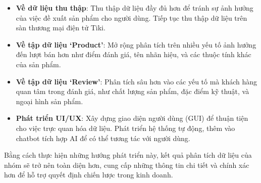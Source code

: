 \begin{itemize}
    \item \textbf{Về dữ liệu thu thập}: Thu thập dữ liệu đầy đủ hơn để tránh sự ảnh hưởng của việc đề xuất sản phẩm cho người dùng. Tiếp tục thu thập dữ liệu trên sàn thương mại điện tử Tiki.
    \item \textbf{Về tập dữ liệu ‘Product’}: Mở rộng phân tích trên nhiều yếu tố ảnh hưởng đến lượt bán hơn như điểm đánh giá, tên nhãn hiệu, và các thuộc tính khác của sản phẩm.
    \item \textbf{Về tập dữ liệu ‘Review’}: Phân tích sâu hơn vào các yếu tố mà khách hàng quan tâm trong đánh giá, như chất lượng sản phẩm, đặc điểm kỹ thuật, và ngoại hình sản phẩm.
    \item \textbf{Phát triển UI/UX}: Xây dựng giao diện người dùng (GUI) để thuận tiện cho việc trực quan hóa dữ liệu. Phát triển hệ thống tự động, thêm vào chatbot tích hợp AI để có thể tương tác với người dùng.
\end{itemize}
Bằng cách thực hiện những hướng phát triển này, kết quả phân tích dữ liệu của nhóm sẽ trở nên toàn diện hơn, cung cấp những thông tin chi tiết và chính xác hơn để hỗ trợ quyết định chiến lược trong kinh doanh.